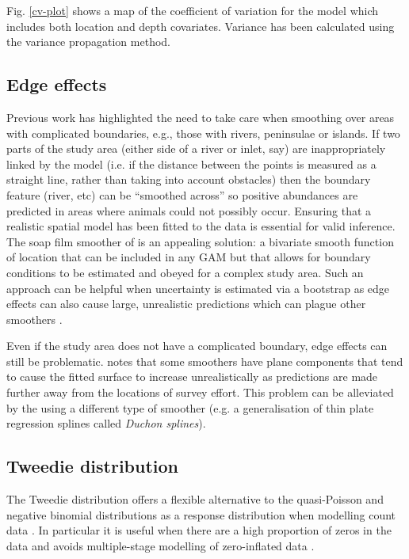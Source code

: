 \documentclass[a4paper,12pt]{article}
\begin{document}
Fig. \ref{cv-plot} shows a map of the coefficient of variation for the model which includes both location and depth covariates. Variance has been calculated using the variance propagation method. 

\subsection*{Edge effects}
\label{s:leakage}

Previous work \citep{Ramsay:2002uo,Wang:2007tf,Wood:2008vo,ScottHayward:2011tc,Miller:2012tm} has highlighted the need to take care when smoothing over areas with complicated boundaries, e.g., those with rivers, peninsulae or islands. If two parts of the study area (either side of a river or inlet, say) are inappropriately linked by the model (i.e. if the distance between the points is measured as a straight line, rather than taking into account obstacles) then the boundary feature (river, etc) can be ``smoothed across'' so positive abundances are predicted in areas where animals could not possibly occur. Ensuring that a realistic spatial model has been fitted to the data is essential for valid inference. The soap film smoother of \cite{Wood:2008vo} is an appealing solution: a bivariate smooth function of location that can be included in any GAM but that allows for boundary conditions to be estimated and obeyed for a complex study area. Such an approach can be helpful when uncertainty is estimated via a bootstrap as edge effects can also cause large, unrealistic predictions which can plague other smoothers \citep{Bravington:2009vo}.

Even if the study area does not have a complicated boundary, edge effects can still be problematic. \cite{Miller:2012wy} notes that some smoothers have plane components that tend to cause the fitted surface to increase unrealistically as predictions are made further away from the locations of survey effort. This problem can be alleviated by the using a different type of smoother (e.g. a generalisation of thin plate regression splines called \textit{Duchon splines}).

\subsection*{Tweedie distribution}
\label{s:Tweedie}

The Tweedie distribution offers a flexible alternative to the quasi-Poisson and negative binomial distributions as a response distribution when modelling count data \citep{Candy:2004tb}. In particular it is useful when there are a high proportion of zeros in the data \cite[][]{Shono:2008ge,Peel:2012jc} and avoids multiple-stage modelling of zero-inflated data \cite[as in][]{Barry:2002bm}.
\end{document}
